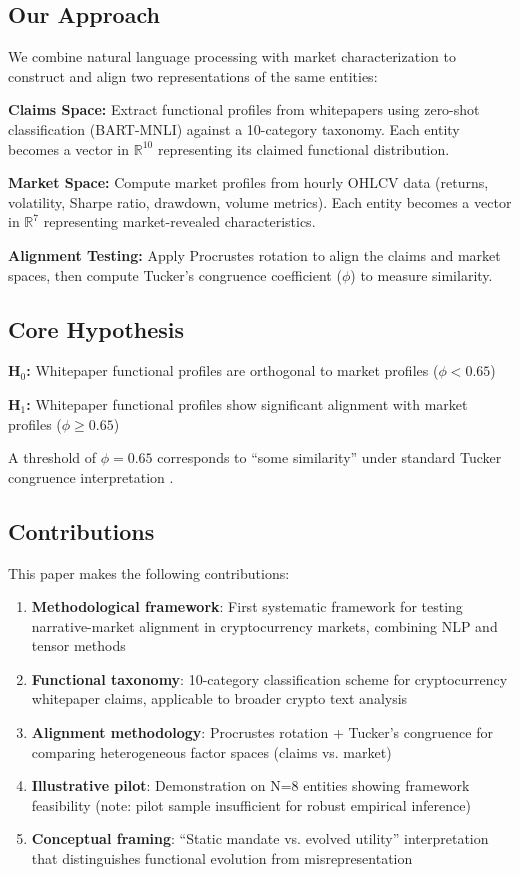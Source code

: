 \documentclass[11pt,twocolumn]{article}
\begin{document}
\subsection{Our Approach}

We combine natural language processing with market characterization to construct and align two representations of the same entities:

\textbf{Claims Space:} Extract functional profiles from whitepapers using zero-shot classification (BART-MNLI) against a 10-category taxonomy. Each entity becomes a vector in $\mathbb{R}^{10}$ representing its claimed functional distribution.

\textbf{Market Space:} Compute market profiles from hourly OHLCV data (returns, volatility, Sharpe ratio, drawdown, volume metrics). Each entity becomes a vector in $\mathbb{R}^{7}$ representing market-revealed characteristics.

\textbf{Alignment Testing:} Apply Procrustes rotation to align the claims and market spaces, then compute Tucker's congruence coefficient ($\phi$) to measure similarity.

\subsection{Core Hypothesis}

\textbf{H$_0$:} Whitepaper functional profiles are orthogonal to market profiles ($\phi < 0.65$)

\textbf{H$_1$:} Whitepaper functional profiles show significant alignment with market profiles ($\phi \geq 0.65$)

A threshold of $\phi = 0.65$ corresponds to ``some similarity'' under standard Tucker congruence interpretation \citep{Lorenzo-Seva2006Tucker}.

\subsection{Contributions}

This paper makes the following contributions:

\begin{enumerate}[leftmargin=*]
    \item \textbf{Methodological framework}: First systematic framework for testing narrative-market alignment in cryptocurrency markets, combining NLP and tensor methods
    \item \textbf{Functional taxonomy}: 10-category classification scheme for cryptocurrency whitepaper claims, applicable to broader crypto text analysis
    \item \textbf{Alignment methodology}: Procrustes rotation + Tucker's congruence for comparing heterogeneous factor spaces (claims vs. market)
    \item \textbf{Illustrative pilot}: Demonstration on N=8 entities showing framework feasibility (note: pilot sample insufficient for robust empirical inference)
    \item \textbf{Conceptual framing}: ``Static mandate vs. evolved utility'' interpretation that distinguishes functional evolution from misrepresentation
\end{enumerate}
\end{document}
